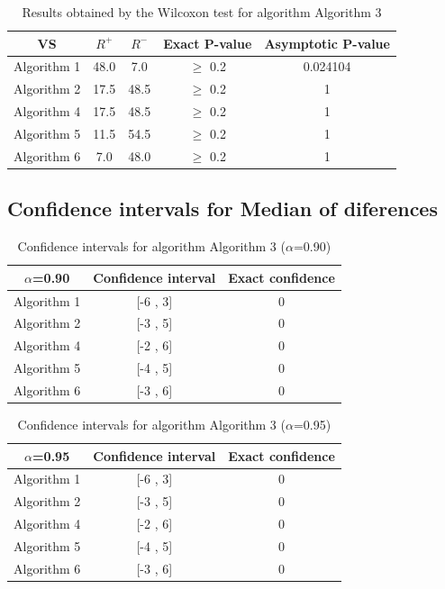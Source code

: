 \documentclass[a4paper,10pt]{article}
\begin{document}
\begin{table}[!htp]
\centering\small
\begin{tabular}{
|c|c|c|c|c|}
\hline
 VS & $R^{+}$ & $R^{-}$ & Exact P-value & Asymptotic P-value \\ \hline 
Algorithm 1 & 48.0 & 7.0 & $\geq$ 0.2 & 0.024104\\ \hline 
Algorithm 2 & 17.5 & 48.5 & $\geq$ 0.2 & 1\\ \hline 
Algorithm 4 & 17.5 & 48.5 & $\geq$ 0.2 & 1\\ \hline 
Algorithm 5 & 11.5 & 54.5 & $\geq$ 0.2 & 1\\ \hline 
Algorithm 6 & 7.0 & 48.0 & $\geq$ 0.2 & 1\\ \hline 

\end{tabular}
\caption{Results obtained by the Wilcoxon test for algorithm Algorithm 3}
\end{table}

\subsection{Confidence intervals for Median of diferences}

\begin{table}[!htp]
\centering\small
\begin{tabular}{
|c|c|c|}
\hline
 $\alpha$=0.90 & Confidence interval & Exact confidence \\ \hline 
Algorithm 1 & [-6 , 3] & 0\\ \hline 
Algorithm 2 & [-3 , 5] & 0\\ \hline 
Algorithm 4 & [-2 , 6] & 0\\ \hline 
Algorithm 5 & [-4 , 5] & 0\\ \hline 
Algorithm 6 & [-3 , 6] & 0\\ \hline 

\end{tabular}
\caption{Confidence intervals for algorithm Algorithm 3 ($\alpha$=0.90)}
\end{table}
\begin{table}[!htp]
\centering\small
\begin{tabular}{
|c|c|c|}
\hline
 $\alpha$=0.95 & Confidence interval & Exact confidence \\ \hline 
Algorithm 1 & [-6 , 3] & 0\\ \hline 
Algorithm 2 & [-3 , 5] & 0\\ \hline 
Algorithm 4 & [-2 , 6] & 0\\ \hline 
Algorithm 5 & [-4 , 5] & 0\\ \hline 
Algorithm 6 & [-3 , 6] & 0\\ \hline 

\end{tabular}
\caption{Confidence intervals for algorithm Algorithm 3 ($\alpha$=0.95)}
\end{table}
\end{document}
